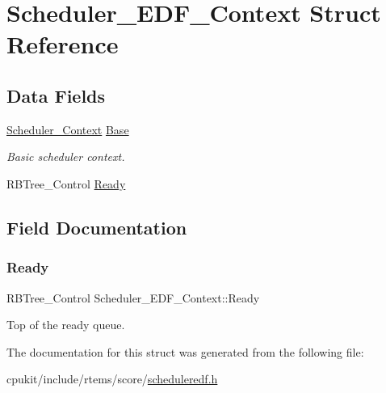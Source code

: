 \hypertarget{structScheduler__EDF__Context}{}\section{Scheduler\+\_\+\+E\+D\+F\+\_\+\+Context Struct Reference}
\label{structScheduler__EDF__Context}
\subsection*{Data Fields}
\begin{DoxyCompactItemize}
\item 
\mbox{\label{structScheduler__EDF__Context_a2c6881cbdd6370003e2c6fcb4e82547f}} 
\mbox{\hyperlink{structScheduler__Context}{Scheduler\+\_\+\+Context}} \mbox{\hyperlink{structScheduler__EDF__Context_a2c6881cbdd6370003e2c6fcb4e82547f}{Base}}
\begin{DoxyCompactList}\small\item\em Basic scheduler context. \end{DoxyCompactList}\item 
R\+B\+Tree\+\_\+\+Control \mbox{\hyperlink{structScheduler__EDF__Context_ad23bf93d37d3e108ce11204970de3ff2}{Ready}}
\end{DoxyCompactItemize}


\subsection{Field Documentation}
\mbox{\label{structScheduler__EDF__Context_ad23bf93d37d3e108ce11204970de3ff2}} 
\subsubsection{\texorpdfstring{Ready}{Ready}}
{\footnotesize\ttfamily R\+B\+Tree\+\_\+\+Control Scheduler\+\_\+\+E\+D\+F\+\_\+\+Context\+::\+Ready}

Top of the ready queue. 

The documentation for this struct was generated from the following file\+:\begin{DoxyCompactItemize}
\item 
cpukit/include/rtems/score/\mbox{\hyperlink{scheduleredf_8h}{scheduleredf.\+h}}\end{DoxyCompactItemize}
